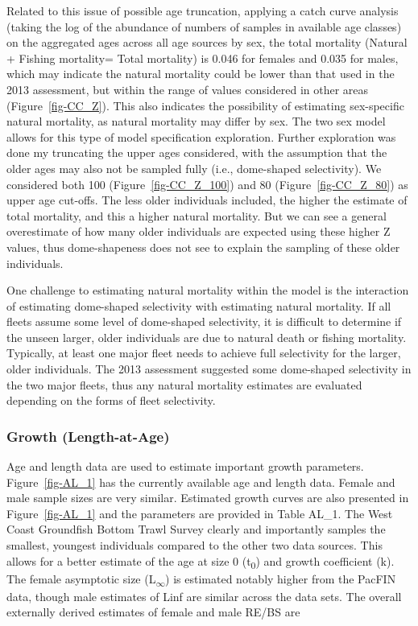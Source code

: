 \documentclass[
]{scrartcl}
\begin{document}
Related to this issue of possible age truncation, applying a catch curve
analysis (taking the log of the abundance of numbers of samples in
available age classes) on the aggregated ages across all age sources by
sex, the total mortality (Natural + Fishing mortality= Total mortality)
is 0.046 for females and 0.035 for males, which may indicate the natural
mortality could be lower than that used in the 2013 assessment, but
within the range of values considered in other areas
(Figure~\ref{fig-CC_Z}). This also indicates the possibility of
estimating sex-specific natural mortality, as natural mortality may
differ by sex. The two sex model allows for this type of model
specification exploration. Further exploration was done my truncating
the upper ages considered, with the assumption that the older ages may
also not be sampled fully (i.e., dome-shaped selectivity). We considered
both 100 (Figure~\ref{fig-CC_Z_100}) and 80 (Figure~\ref{fig-CC_Z_80})
as upper age cut-offs. The less older individuals included, the higher
the estimate of total mortality, and this a higher natural mortality.
But we can see a general overestimate of how many older individuals are
expected using these higher Z values, thus dome-shapeness does not see
to explain the sampling of these older individuals.

One challenge to estimating natural mortality within the model is the
interaction of estimating dome-shaped selectivity with estimating
natural mortality. If all fleets assume some level of dome-shaped
selectivity, it is difficult to determine if the unseen larger, older
individuals are due to natural death or fishing mortality. Typically, at
least one major fleet needs to achieve full selectivity for the larger,
older individuals. The 2013 assessment suggested some dome-shaped
selectivity in the two major fleets, thus any natural mortality
estimates are evaluated depending on the forms of fleet selectivity.

\subsubsection{Growth (Length-at-Age)}\label{growth-length-at-age}

Age and length data are used to estimate important growth parameters.
Figure~\ref{fig-AL_1} has the currently available age and length data.
Female and male sample sizes are very similar. Estimated growth curves
are also presented in Figure~\ref{fig-AL_1} and the parameters are
provided in Table AL\_1. The West Coast Groundfish Bottom Trawl Survey
clearly and importantly samples the smallest, youngest individuals
compared to the other two data sources. This allows for a better
estimate of the age at size 0 (t\textsubscript{0}) and growth
coefficient (k). The female asymptotic size
(L\textsubscript{\(\infty\)}) is estimated notably higher from the
PacFIN data, though male estimates of Linf are similar across the data
sets. The overall externally derived estimates of female and male RE/BS
are
\end{document}
